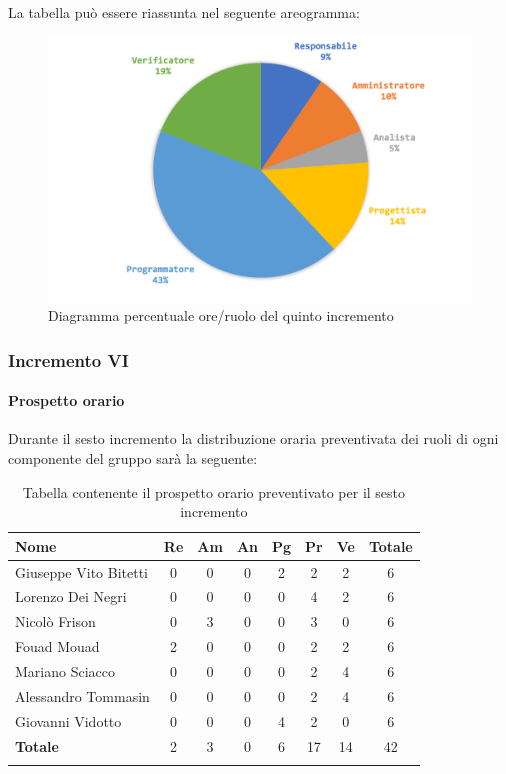 			
			La tabella può essere riassunta nel seguente areogramma:
			\begin{figure}[H]
				\centering
				\includegraphics[width=0.8\linewidth]{./images/preventivo/incremento5-2.png}
				\caption{Diagramma percentuale ore/ruolo del quinto incremento}
				\label{fig:diagramma costi ruolo incremento V}
			\end{figure}
			\pagebreak
			
			
		\subsubsection{Incremento VI}
			\paragraph{Prospetto orario}
			Durante il sesto incremento la distribuzione oraria preventivata dei ruoli di ogni componente del gruppo sarà la seguente:
			
			\begin{longtable}{|l|c|c|c|c|c|c|c|}
				\hline
				\rowcolor{lighter-grayer}
				\textbf{Nome} & \textbf{Re} & \textbf{Am} & \textbf{An} & \textbf{Pg}  & \textbf{Pr}   & \textbf{Ve} & \textbf{Totale} \\
				\hline
				\endfirsthead
				
				\hline
				Giuseppe Vito Bitetti 		 & 0 & 0 & 0 & 2 & 2 & 2 & 6\\
				\hline
				\hline
				Lorenzo Dei Negri			 & 0 & 0 & 0 & 0 & 4 & 2 & 6\\
				\hline
				\hline
				Nicolò Frison				      & 0 & 3 & 0 & 0 & 3 & 0 & 6\\
				\hline
				\hline
				Fouad Mouad 				   & 2 & 0 & 0 & 0 & 2 & 2 & 6\\
				\hline
				\hline
				Mariano Sciacco 			 & 0 & 0 & 0 & 0 & 2 & 4 & 6\\
				\hline
				\hline
				Alessandro Tommasin    & 0 & 0 & 0 & 0 & 2 & 4 & 6\\
				\hline
				\hline
				Giovanni Vidotto 			  & 0 & 0 & 0 & 4 & 2 & 0 & 6\\
				\hline 
				\textbf{Totale}			 		& 2 & 3 & 0 & 6 & 17 & 14 & 42\\
				\hline
				\caption{Tabella contenente il prospetto orario preventivato per il sesto incremento}
			\end{longtable}
			
